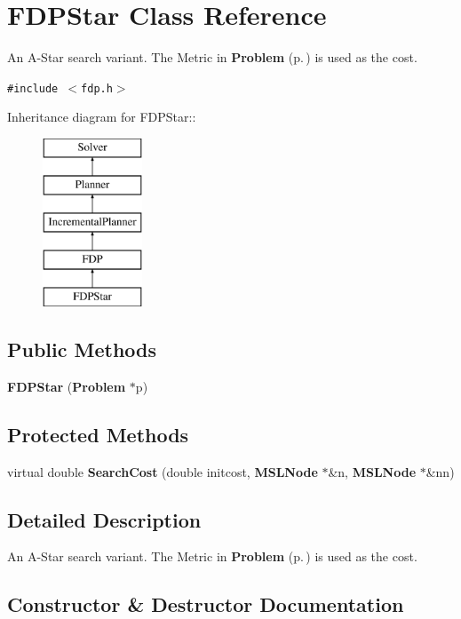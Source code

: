 \section{FDPStar  Class Reference}
\label{class_FDPStar}
An A-Star search variant. The Metric in {\bf Problem} {\rm (p.\,\pageref{class_Problem})} is used as the cost. 


{\tt \#include $<$fdp.h$>$}

Inheritance diagram for FDPStar::\begin{figure}[H]
\begin{center}
\leavevmode
\includegraphics[height=5cm]{class_FDPStar}
\end{center}
\end{figure}
\subsection*{Public Methods}
\begin{CompactItemize}
\item 
{\bf FDPStar} ({\bf Problem} $\ast$p)
\end{CompactItemize}
\subsection*{Protected Methods}
\begin{CompactItemize}
\item 
virtual double {\bf Search\-Cost} (double initcost, {\bf MSLNode} $\ast$\&n, {\bf MSLNode} $\ast$\&nn)
\end{CompactItemize}


\subsection{Detailed Description}
An A-Star search variant. The Metric in {\bf Problem} {\rm (p.\,\pageref{class_Problem})} is used as the cost.



\subsection{Constructor \& Destructor Documentation}

